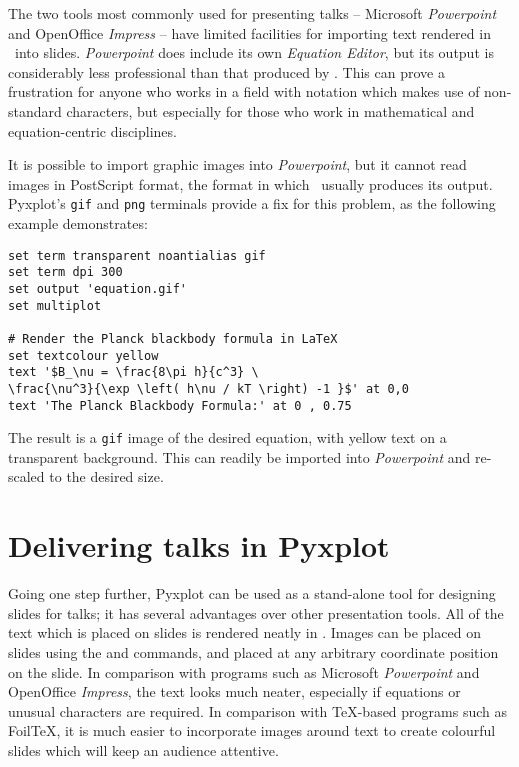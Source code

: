 The two tools most commonly used for presenting talks --
Microsoft {\it Powerpoint} and
OpenOffice {\it Impress} -- have limited facilities for importing
text rendered in \latexdcf\ into slides. {\it Powerpoint} does
include its own {\it Equation Editor}, but its output is considerably less
professional than that produced by \latexdcf.  This can prove a frustration for
anyone who works in a field with notation which makes use of non-standard
characters, but especially for those who work in mathematical and
equation-centric disciplines.

It is possible to import graphic images into {\it Powerpoint}, but it cannot
read images in PostScript format, the format in which \latexdcf\ usually produces
its output.  Pyxplot's {\tt gif} and {\tt png} terminals provide a fix for this
problem, as the following example demonstrates:

\begin{verbatim}
set term transparent noantialias gif
set term dpi 300
set output 'equation.gif'
set multiplot

# Render the Planck blackbody formula in LaTeX
set textcolour yellow
text '$B_\nu = \frac{8\pi h}{c^3} \
\frac{\nu^3}{\exp \left( h\nu / kT \right) -1 }$' at 0,0
text 'The Planck Blackbody Formula:' at 0 , 0.75
\end{verbatim}

The result is a {\tt gif} image of the desired equation, with yellow text on a
transparent background. This can readily be imported into {\it Powerpoint} and
re-scaled to the desired size.

\section{Delivering talks in Pyxplot}

Going one step further, Pyxplot can be used as a stand-alone tool for designing
slides for talks; it has several advantages over other presentation tools.  All
of the text which is placed on slides is rendered neatly in \latexdcf.  Images can
be placed on slides using the \indcmdts{jpeg} and \indcmdts{eps} commands, and
placed at any arbitrary coordinate position on the slide.  In comparison with
programs such as Microsoft {\it Powerpoint}\index{Microsoft Powerpoint} and
OpenOffice\index{OpenOffice} {\it Impress}, the text looks much neater,
especially if equations or unusual characters are required. In comparison with
\TeX-based programs such as Foil\TeX, it is much easier to incorporate images
around text to create colourful slides which will keep an audience attentive.

